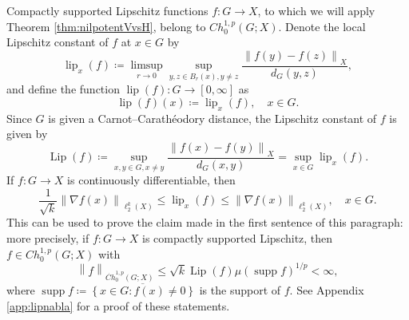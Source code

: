 \documentclass[11pt,reqno]{amsart}
\newcommand{\1}{\mathbf 1}
\begin{document}
Compactly supported Lipschitz functions $f:G\to X$, to which we will apply Theorem \ref{thm:nilpotentVvsH}, belong to $Ch_0^{1,p}\left(G;X\right)$. Denote the local Lipschitz constant of $f$ at $x\in G$ by
\[
\operatorname{lip}_x\left(f\right)\coloneqq \limsup_{r\to 0} \sup_{y,z\in B_r\left(x\right),y\neq z}\frac{\left\|f(y)-f(z)\right\|_X}{d_G\left(y,z\right)},
\]
and define the function $\operatorname{lip}\left(f\right):G\to [0,\infty]$ as
\[
\operatorname{lip}\left(f\right)\left(x\right)\coloneqq\operatorname{lip}_x\left(f\right),\quad x\in G.
\]
Since $G$ is given a Carnot--Carath\'eodory distance, the Lipschitz constant of $f$ is given by
\[
\operatorname{Lip}\left(f\right)\coloneqq \sup_{x,y\in G,x\neq y}\frac{\left\|f(x)-f(y)\right\|_X}{d_G\left(x,y\right)}=\sup_{x\in G}\operatorname{lip}_x\left(f\right).
\]
If $f:G\to X$ is continuously differentiable, then
\begin{equation}\label{ineq:lip-nabla}
    \frac{1}{\sqrt{k}}\left\|\nabla f(x)\right\|_{\ell_2^k\left(X\right)}\le \operatorname{lip}_x\left(f\right)\le \left\|\nabla f(x)\right\|_{\ell_2^k\left(X\right)},\quad x\in G.
\end{equation}
This can be used to prove the claim made in the first sentence of this paragraph: more precisely, if $f:G\to X$ is compactly supported Lipschitz, then $f\in Ch^{1,p}_0\left(G;X\right)$ with
\begin{equation}\label{eq:cheeger-lipschitz}
    \left\|f\right\|_{\dot{Ch}_0^{1,p}\left(G;X\right)}\le \sqrt{k}\operatorname{Lip}\left(f\right)\mu\left(\operatorname{supp}f\right)^{1/p}<\infty,
\end{equation}
where $\operatorname{supp}f\coloneqq \overline{\left\{x\in G:f\left(x\right)\neq 0\right\}}$ is the support of $f$. See Appendix \ref{app:lipnabla} for a proof of these statements.
\end{document}
